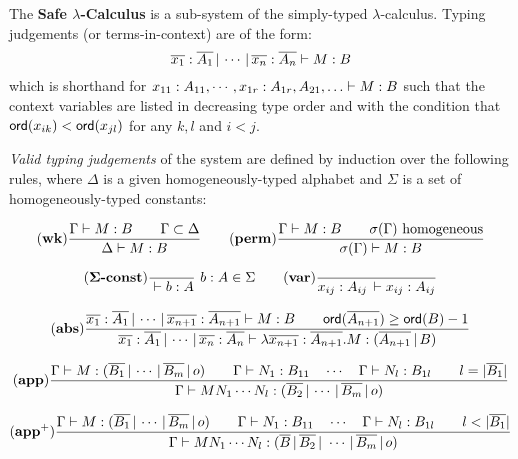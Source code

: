 The \textbf{Safe $\lambda$-Calculus} is a sub-system of the
simply-typed $\lambda$-calculus. Typing judgements (or
terms-in-context) are of the form:
\begin{equation}
\nonumber {{\overline{x_1}:\overline{A_1} \, | \, \cdots \, | \,
\overline{x_n} :  \overline{A_n}} \vdash {M : B}}
\end{equation}
which is shorthand for ${{x_{11} : A_{11}, \cdots, x_{1r}:
A_{1r}, A_{21},\ldots } \vdash {M : B}}$ such that the context variables are listed in decreasing type order and
 with the condition that ${\sf ord}(x_{ik}) < {\sf ord}(x_{jl})$ for any $k, l$ and $i<j$.

\emph{Valid typing judgements} of the system are defined by
induction over the following rules, where $\Delta$ is a given
homogeneously-typed alphabet and $\Sigma$ is a set of
homogeneously-typed constants:

$$ \mathbf{(wk)}
    {   \frac{\displaystyle  {{\Gamma} \vdash {M:B}} \qquad {\Gamma \subset \Delta} }{ {{\Delta } \vdash {M : B}}}
   }
\qquad
    \mathbf{(perm)}
    {
      \frac{\displaystyle  {{\Gamma} \vdash {M:B}} \qquad \sigma(\Gamma) \hbox{ homogeneous} }{ {{\sigma(\Gamma)} \vdash {M : B}} }
    }
$$

$$ \mathbf{(\Sigma\mbox{\textbf{-const}})}  \frac{\displaystyle }{{{} \vdash {b : A}}}\ b:A \in \Sigma
\qquad
 \mathbf{(var)} \frac{\displaystyle }{{{x_{ij} : A_{ij}\, } \vdash {x_{ij} : A_{ij}}}}
$$

$$\mathbf{(abs)}
\frac{\displaystyle 
 {{{\overline{x_1} : \overline{A_1}\, | \, \cdots\, | \, \overline{x_{n+1}} : \overline{A_{n+1}}} \vdash {M : B}}} 		    \qquad {\sf ord}(\overline{A_{n+1}}) \geq {\sf ord}(B) -1
 }{ {{\overline{x_1} : \overline{A_1}\, | \, \cdots\, | \, \overline{x_{n}} : \overline{A_{n}}} \vdash { \lambda \overline{x_{n+1}} : \overline{A_{n+1}} .M : (\overline{A_{n+1}} \, | \, B)  }}
 }
$$

$$ \mathbf{(app)} \frac{\displaystyle {{{\Gamma} \vdash {M : (\overline{B_1} \, | \, \cdots \, | \, \overline{B_m} \, | \, o)}} \qquad
{{\Gamma} \vdash {N_1 : B_{11}}} \quad \cdots \quad {{\Gamma} \vdash {N_{l} :
B_{1l}}} \qquad l = |\overline{B_1}| }}{ {{\Gamma} \vdash {M N_1
\cdots N_{l} : (\overline{B_2} \, | \, \cdots \, | \,
\overline{B_m} \, | \, o)}}} $$

$$ \mathbf{(app^+)} \frac{\displaystyle {{\Gamma} \vdash {M : (\overline{B_1} \, | \, \cdots \, | \, \overline{B_m} \, | \, o)}} \qquad
    {{\Gamma} \vdash {N_1 : B_{11}}} \quad \cdots \quad {{\Gamma} \vdash {N_{l} :
    B_{1l}}} \qquad l < |\overline{B_1}| }{ {{\Gamma} \vdash {M N_1
    \cdots N_{l} : (\overline{B} \, | \, \overline{B_2} \, | \ \cdots \, | \,
    \overline{B_m} \, | \, o)}}} $$

